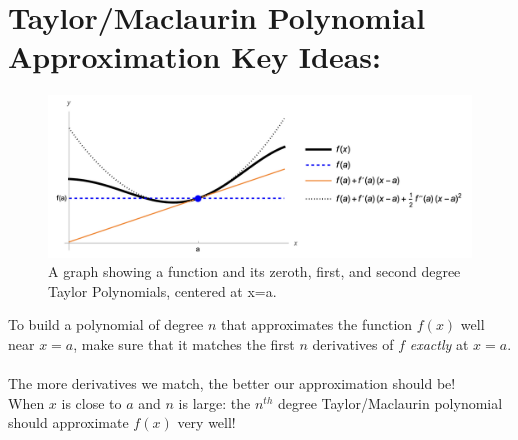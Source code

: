 %
\setlength{\columnseprule}{.4pt}
\setlength{\columnsep}{3em}

\section*{Taylor/Maclaurin Polynomial Approximation Key Ideas:}

\begin{figure}[!h]

\includegraphics[width=1.05\textwidth]{Ch8s7-Taylor2.png}
\caption{A graph showing a function and its zeroth, first, and second degree Taylor Polynomials, centered at x=a.}
\end{figure}

To build a polynomial of degree \(n\) that approximates the function \(f(x)\) well near \(x=a\), make sure that it matches the first \(n\) derivatives of \(f\) \textit{exactly} at \(x=a\).\\~\\
 The more derivatives we match, the better our approximation should be!\\


When \(x\) is close to \(a\) and \(n\) is large: the \(n^{th}\) degree Taylor/Maclaurin polynomial should approximate \(f(x)\) very well!\\


\vspace*{.2in}


